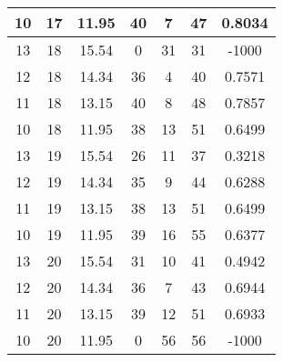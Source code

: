 \documentclass[letterpaper, 12pt]{article}
\begin{document}
\begin{longtable}{|c|c|c|c|c|c|c|}
\hline
10 & 17 & 11.95 & 40 & 7 & 47 & 0.8034 \\
\hline
13 & 18 & 15.54 & 0 & 31 & 31 & -1000 \\
\hline
12 & 18 & 14.34 & 36 & 4 & 40 & 0.7571 \\
\hline
11 & 18 & 13.15 & 40 & 8 & 48 & 0.7857 \\
\hline
10 & 18 & 11.95 & 38 & 13 & 51 & 0.6499 \\
\hline
13 & 19 & 15.54 & 26 & 11 & 37 & 0.3218 \\
\hline
12 & 19 & 14.34 & 35 & 9 & 44 & 0.6288 \\
\hline
11 & 19 & 13.15 & 38 & 13 & 51 & 0.6499 \\
\hline
10 & 19 & 11.95 & 39 & 16 & 55 & 0.6377 \\
\hline
13 & 20 & 15.54 & 31 & 10 & 41 & 0.4942 \\
\hline
12 & 20 & 14.34 & 36 & 7 & 43 & 0.6944 \\
\hline
11 & 20 & 13.15 & 39 & 12 & 51 & 0.6933 \\
\hline
10 & 20 & 11.95 & 0 & 56 & 56 & -1000 \\
\hline
\end{longtable}
\end{document}
